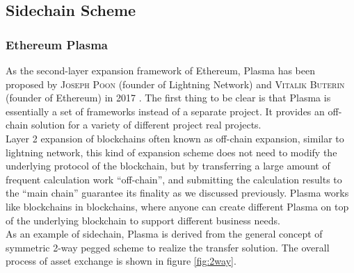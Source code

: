 \subsection{Sidechain Scheme}
\label{sec:side}


\subsubsection{Ethereum Plasma}
\noindent As the second-layer expansion framework of Ethereum, Plasma has been proposed by \textsc{Joseph Poon} (founder of Lightning Network) and \textsc{Vitalik Buterin} (founder of Ethereum) in 2017 \cite{poon2017plasma}. The first thing to be clear is that Plasma is essentially a set of frameworks instead of a separate project. It provides an off-chain solution for a variety of different project real projects. \\
\noindent Layer 2 expansion of blockchains often known as off-chain expansion, similar to lightning network, this kind of expansion scheme does not need to modify the underlying protocol of the blockchain, but by transferring a large amount of frequent calculation work ``off-chain'', and submitting the calculation results to the ``main chain'' guarantee its finality as we discussed previously. Plasma works like blockchains in blockchains, where anyone can create different Plasma on top of the underlying blockchain to support different business needs. \\
\noindent As an example of sidechain, Plasma is derived from the general concept of symmetric 2-way pegged scheme to realize the transfer solution. The overall process of asset exchange is shown in figure \ref{fig:2way}. 

